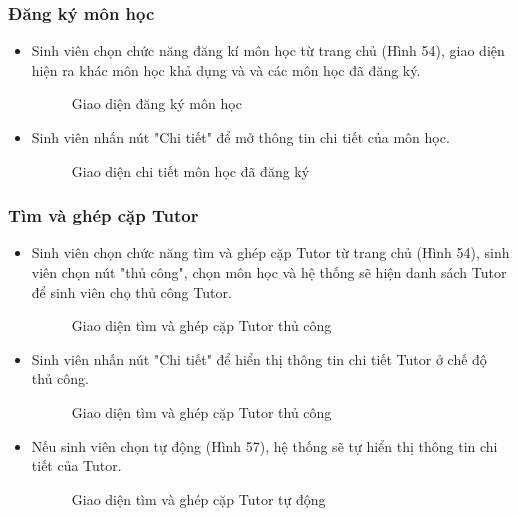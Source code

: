 \subsubsection*{Đăng ký môn học}
\begin{itemize}
    \item Sinh viên chọn chức năng đăng kí môn học từ trang chủ (Hình 54), giao diện hiện ra khác môn học khả dụng và và các môn học đã đăng ký.
    \begin{figure}[H]
    \centering
    \setlength{\fboxsep}{2pt}     
    \setlength{\fboxrule}{0.5pt}   
    \caption{Giao diện đăng ký môn học}
    \end{figure}
    \item Sinh viên nhấn nút "Chi tiết" để mở thông tin chi tiết của môn học.
    \begin{figure}[H]
    \centering
    \setlength{\fboxsep}{2pt}     
    \setlength{\fboxrule}{0.5pt}   
    \caption{Giao diện chi tiết môn học đã đăng ký}
    \end{figure}
\end{itemize}

\subsubsection*{Tìm và ghép cặp Tutor}
\begin{itemize}
    \item Sinh viên chọn chức năng tìm và ghép cặp Tutor từ trang chủ (Hình 54), sinh viên chọn nút "thủ công", chọn môn học và hệ thống sẽ hiện danh sách Tutor để sinh viên chọ thủ công Tutor.
    \begin{figure}[H]
    \centering
    \setlength{\fboxsep}{2pt}     
    \setlength{\fboxrule}{0.5pt}   
    \caption{Giao diện tìm và ghép cặp Tutor thủ công}
    \end{figure}
    \item Sinh viên nhấn nút "Chi tiết" để hiển thị thông tin chi tiết Tutor ở chế độ thủ công.
    \begin{figure}[H]
    \centering
    \setlength{\fboxsep}{2pt}     
    \setlength{\fboxrule}{0.5pt}   
    \caption{Giao diện tìm và ghép cặp Tutor thủ công}
    \end{figure}
    \item Nếu sinh viên chọn tự động (Hình 57), hệ thống sẽ tự hiển thị thông tin chi tiết của Tutor.
    \begin{figure}[H]
    \centering
    \setlength{\fboxsep}{2pt}     
    \setlength{\fboxrule}{0.5pt}   
    \caption{Giao diện tìm và ghép cặp Tutor tự động}
    \end{figure}
\end{itemize}

